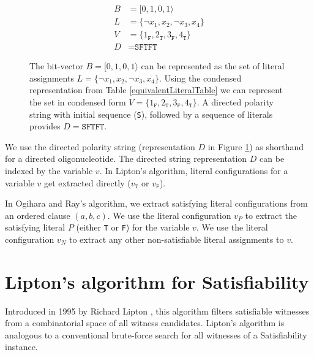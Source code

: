 \begin{figure}[htbp]
\begin{center}

	\begin{align*}
	B &= [0, 1, 0, 1 \rangle \\
	L &= \{ \neg x_1, x_2, \neg x_3, x_4 \} \\
	V &= \{ 1_{\texttt{F}}, 2_{\texttt{T}}, 3_{\texttt{F}}, 4_{\texttt{T}} \} \\
	D &= \texttt{SFTFT} 
	\end{align*}

\caption{The bit-vector $B = [0, 1, 0, 1 \rangle$ can be represented as the set of literal assignments $L = \{ \neg x_1, x_2, \neg x_3, x_4 \}$.  Using the condensed representation from Table \ref{equivalentLiteralTable} we can represent the set in condensed form $V = \{ 1_{\texttt{F}}, 2_{\texttt{T}}, 3_{\texttt{F}}, 4_{\texttt{T}} \}$.  A directed polarity string with initial sequence (\texttt{S}), followed by a sequence of literals provides $D = \texttt{SFTFT}$.}
\label{equivalentWitnessRepresentations}
\end{center}
\end{figure}

\FloatBarrier

We use the directed polarity string (representation $D$ in Figure \ref{equivalentWitnessRepresentations}) as shorthand for a directed oligonucleotide.  The directed string representation $D$ can be indexed by the variable $v$.  In Lipton's algorithm, literal configurations for a variable $v$ get extracted directly ($v_{\texttt{T}}$ or $v_{\texttt{F}}$).

In Ogihara and Ray's algorithm, we extract satisfying literal configurations from an ordered clause $(a, b, c)$.  We use the literal configuration $v_P$ to extract the satisfying literal $P$ (either \texttt{T} or \texttt{F}) for the variable $v$.  We use the literal configuration $v_N$ to extract any other non-satisfiable literal assignments to $v$.

\section{Lipton's algorithm for {\sc Satisfiability}}


Introduced in 1995 by Richard Lipton \cite{Lipton95usingdna}, this algorithm filters satisfiable witnesses from a combinatorial space of all witness candidates.  Lipton's algorithm is analogous to a conventional brute-force search for all witnesses of a {\sc Satisfiability} instance.


